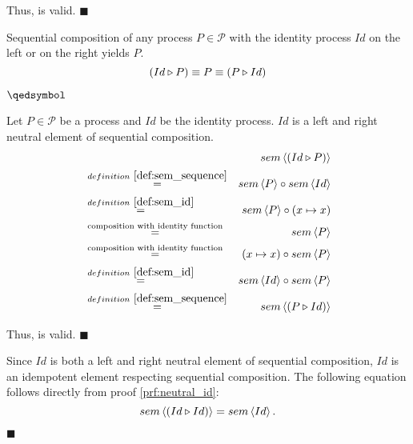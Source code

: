 \begin{myproof}
\vspace*{-0.75em}
Thus,  is valid. \hfill$\blacksquare$
\end{myproof}


\begin{theorem}
\label{thm:idempotence_identity}
Sequential composition of any process $P \in \mathcal{P}$ with the identity process $Id$ on the left or on the right yields $P$.
\begin{equation*}
  \left( Id \triangleright P \right) \equiv P \equiv \left( P \triangleright Id \right)
\end{equation*}

\vspace*{-0.75em}
\hfill$\qedsymbol$
\end{theorem}

\begin{myproof}
\label{prf:neutral_id}
Let $P \in \mathcal{P}$ be a process and $Id$ be the identity process. $Id$ is a left and right neutral element of sequential composition.
\begin{eqnarray*}
  & & \sem{\sequence{Id}{P}} \\
    & \overset{\defref{def:sem_sequence}}{=} & \sem{P} \circ \sem{Id} \\
    & \overset{\defref{def:sem_id}}{=} & \sem{P} \circ \left( x \mapsto x \right) \\
    & \overset{\text{composition with identity function}}{=} & \sem{P} \\
    & \overset{\text{composition with identity function}}{=} & \left( x \mapsto x \right) \circ \sem{P} \\
    & \overset{\defref{def:sem_id}}{=} & \sem{Id} \circ \sem{P} \\
    & \overset{\defref{def:sem_sequence}}{=} & \sem{\sequence{P}{Id}} \\
\end{eqnarray*}

\vspace*{-2em}
Thus,  is valid. \hfill$\blacksquare$
\end{myproof}

\clearpage

\begin{corollary}
Since $Id$ is both a left and right neutral element of sequential composition, $Id$ is an idempotent element respecting sequential composition. The following equation follows directly from proof \ref{prf:neutral_id}:
\begin{equation*}
  sem \left\langle \left( Id \triangleright Id \right) \right\rangle = sem \left\langle Id \right\rangle.
\end{equation*}

\hfill$\blacksquare$
\end{corollary}


